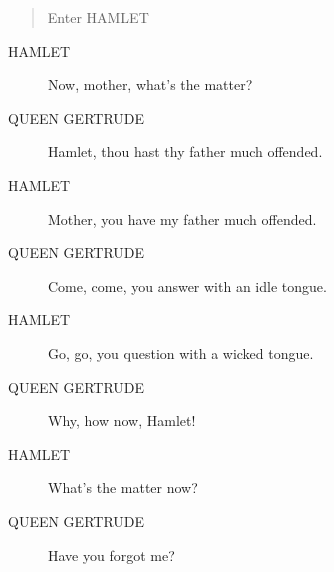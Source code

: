\documentclass{article}
\begin{document}
\begin{quote}
Enter HAMLET
\end{quote}
          
\begin{description}
            
\item[HAMLET] Now, mother, what's the matter?
\end{description}
          
\begin{description}
            
\item[QUEEN GERTRUDE] Hamlet, thou hast thy father much offended.
\end{description}
          
\begin{description}
            
\item[HAMLET] Mother, you have my father much offended.
\end{description}
          
\begin{description}
            
\item[QUEEN GERTRUDE] Come, come, you answer with an idle tongue.
\end{description}
          
\begin{description}
            
\item[HAMLET] Go, go, you question with a wicked tongue.
\end{description}
          
\begin{description}
            
\item[QUEEN GERTRUDE] Why, how now, Hamlet!
\end{description}
          
\begin{description}
            
\item[HAMLET] What's the matter now?
\end{description}
          
\begin{description}
            
\item[QUEEN GERTRUDE] Have you forgot me?
\end{description}
          
\end{document}
